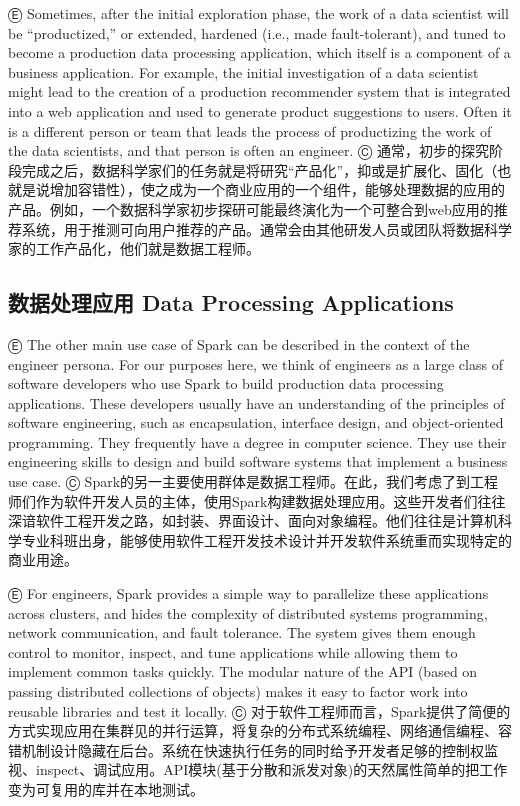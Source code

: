 Ⓔ Sometimes, after the initial exploration phase, the work of a data
scientist will be ``productized,'' or extended, hardened (i.e., made
fault-tolerant), and tuned to become a production data processing
application, which itself is a component of a business application. For
example, the initial investigation of a data scientist might lead to the
creation of a production recommender system that is integrated into a
web application and used to generate product suggestions to users. Often
it is a different person or team that leads the process of productizing
the work of the data scientists, and that person is often an engineer. Ⓒ
通常，初步的探究阶段完成之后，数据科学家们的任务就是将研究``产品化''，抑或是扩展化、固化（也就是说增加容错性），使之成为一个商业应用的一个组件，能够处理数据的应用的产品。例如，一个数据科学家初步探研可能最终演化为一个可整合到web应用的推荐系统，用于推测可向用户推荐的产品。通常会由其他研发人员或团队将数据科学家的工作产品化，他们就是数据工程师。

\subsection{数据处理应用 Data Processing
Applications}\label{ux6570ux636eux5904ux7406ux5e94ux7528-data-processing-applications}

Ⓔ The other main use case of Spark can be described in the context of
the engineer persona. For our purposes here, we think of engineers as a
large class of software developers who use Spark to build production
data processing applications. These developers usually have an
understanding of the principles of software engineering, such as
encapsulation, interface design, and object-oriented programming. They
frequently have a degree in computer science. They use their engineering
skills to design and build software systems that implement a business
use case. Ⓒ
Spark的另一主要使用群体是数据工程师。在此，我们考虑了到工程师们作为软件开发人员的主体，使用Spark构建数据处理应用。这些开发者们往往深谙软件工程开发之路，如封装、界面设计、面向对象编程。他们往往是计算机科学专业科班出身，能够使用软件工程开发技术设计并开发软件系统重而实现特定的商业用途。

Ⓔ For engineers, Spark provides a simple way to parallelize these
applications across clusters, and hides the complexity of distributed
systems programming, network communication, and fault tolerance. The
system gives them enough control to monitor, inspect, and tune
applications while allowing them to implement common tasks quickly. The
modular nature of the API (based on passing distributed collections of
objects) makes it easy to factor work into reusable libraries and test
it locally. Ⓒ
对于软件工程师而言，Spark提供了简便的方式实现应用在集群见的并行运算，将复杂的分布式系统编程、网络通信编程、容错机制设计隐藏在后台。系统在快速执行任务的同时给予开发者足够的控制权监视、inspect、调试应用。API模块(基于分散和派发对象)的天然属性简单的把工作变为可复用的库并在本地测试。

